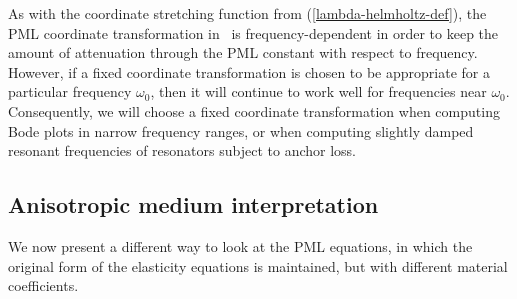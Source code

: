 \documentclass{article}
\begin{document}
As with the coordinate stretching function from
(\ref{lambda-helmholtz-def}), the PML coordinate transformation
in~\cite{Basu:2003:PML} is frequency-dependent in order to keep the
amount of attenuation through the PML constant with respect to
frequency.  However, if a fixed coordinate transformation is chosen to
be appropriate for a particular frequency $\omega_0$, then it will
continue to work well for frequencies near $\omega_0$.  Consequently,
we will choose a fixed coordinate transformation when computing Bode
plots in narrow frequency ranges, or when computing slightly damped
resonant frequencies of resonators subject to anchor loss.


\subsection{Anisotropic medium interpretation}

We now present a different way to look at the PML equations,
in which the original form of the elasticity equations is maintained,
but with different material coefficients.
\end{document}
